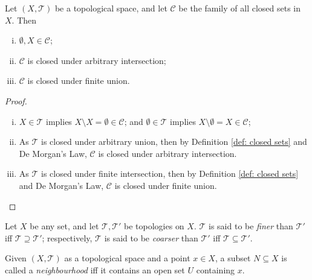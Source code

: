 \begin{proposition}
	\label{prop: dark side of topology}
	Let $(X, \mathcal T)$ be a topological space, and let $\mathcal C$ be the family of all closed sets in $X$. Then
	\begin{enumerate}[(i)]
		\item
		$\emptyset, X \in \mathcal C$;
		
		\item
		$\mathcal C$ is closed under arbitrary intersection;
		
		\item
		$\mathcal C$ is closed under finite union.
	\end{enumerate}
	
	\begin{proof}
		\
		\begin{enumerate}[(i)]
			\item
			$X \in \mathcal T$ implies $X \setminus X = \emptyset \in \mathcal C$; and $\emptyset \in \mathcal T$ implies $X \setminus \emptyset = X \in \mathcal C$;
			
			\item
			As $\mathcal T$ is closed under arbitrary union, then by Definition \ref{def: closed sets} and De Morgan's Law, $\mathcal C$ is closed under arbitrary intersection.
			
			\item
			As $\mathcal T$ is closed under finite intersection, then by Definition \ref{def: closed sets} and De Morgan's Law, $\mathcal C$ is closed under finite union.
		\end{enumerate}
	\end{proof}
\end{proposition}


\begin{definition}
	\label{def: finer and coarser topology} Let $X$ be any set, and let $\mathcal T, \mathcal T'$ be topologies on $X$. $\mathcal T$ is said to be \textit{finer} than $\mathcal T'$ iff $\mathcal T \supseteq \mathcal T'$; respectively, $\mathcal T$ is said to be \textit{coarser} than $\mathcal T'$ iff $\mathcal T \subseteq \mathcal T'$.
\end{definition}


\begin{definition}
	[neighbourhood]
	\label{def: neighbourhood}
	Given $(X, \mathcal T)$ as a topological space and a point $x \in X$, a subset $N \subseteq X$ is called a \textit{neighbourhood} iff it contains an open set $U$ containing $x$.
\end{definition}



